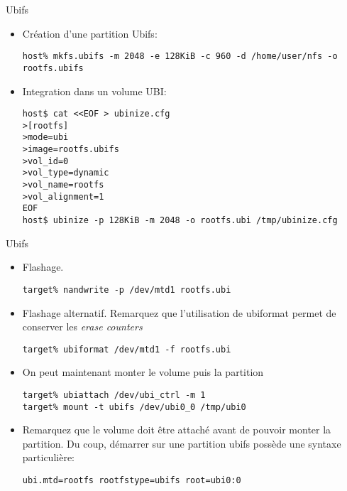 \begin{frame}[fragile=singleslide]{Ubifs}
  \begin{itemize}
  \item Création d'une partition Ubifs:
    \begin{lstlisting}
host% mkfs.ubifs -m 2048 -e 128KiB -c 960 -d /home/user/nfs -o rootfs.ubifs
     \end{lstlisting}
  \item Integration dans un volume UBI:
    \begin{lstlisting}
host$ cat <<EOF > ubinize.cfg
>[rootfs]
>mode=ubi
>image=rootfs.ubifs
>vol_id=0
>vol_type=dynamic
>vol_name=rootfs
>vol_alignment=1
EOF
host$ ubinize -p 128KiB -m 2048 -o rootfs.ubi /tmp/ubinize.cfg
     \end{lstlisting}
  \end{itemize}
\end{frame}

\begin{frame}[fragile=singleslide]{Ubifs}
  \begin{itemize}
  \item Flashage.
    \begin{lstlisting}
target% nandwrite -p /dev/mtd1 rootfs.ubi
     \end{lstlisting}
  \item Flashage alternatif. Remarquez que l'utilisation de ubiformat permet de
    conserver les \emph{erase counters}
    \begin{lstlisting}
target% ubiformat /dev/mtd1 -f rootfs.ubi
     \end{lstlisting}
  \item On peut maintenant monter le volume puis la partition
    \begin{lstlisting}
target% ubiattach /dev/ubi_ctrl -m 1
target% mount -t ubifs /dev/ubi0_0 /tmp/ubi0
     \end{lstlisting}
     \item Remarquez que le volume doit être attaché avant de pouvoir monter la
       partition. Du coup, démarrer sur une partition ubifs possède une syntaxe
       particulière:
    \begin{lstlisting}
ubi.mtd=rootfs rootfstype=ubifs root=ubi0:0
     \end{lstlisting}
  \end{itemize}
\end{frame}

